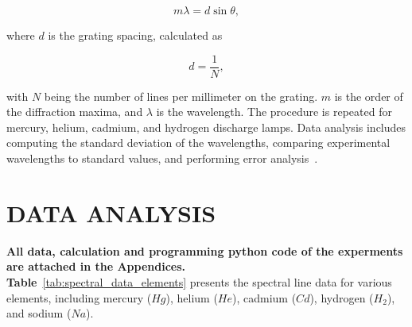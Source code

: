 \documentclass[a4paper,11pt]{article}
\begin{document}
\[
m \lambda = d \sin \theta,
\]

where \( d \) is the grating spacing, calculated as 

\[
d = \frac{1}{N},
\]

with \( N \) being the number of lines per millimeter on the grating. \( m \) is the order of the diffraction maxima, and \( \lambda \) is the wavelength. The procedure is repeated for mercury, helium, cadmium, and hydrogen discharge lamps. Data analysis includes computing the standard deviation of the wavelengths, comparing experimental wavelengths to standard values, and performing error analysis~\cite{usm_diffraction}.

\newpage
\section*{\center DATA ANALYSIS}
\label{sec:DATA ANALYSIS}
\textbf{All data, calculation and programming python code of the experments are attached in the Appendices.}\\

\quad \textbf{Table}~\ref{tab:spectral_data_elements} presents the spectral line data for various elements, including mercury (\(Hg\)), helium (\(He\)), cadmium (\(Cd\)), hydrogen (\(H_2\)), and sodium (\(Na\)).
\end{document}
